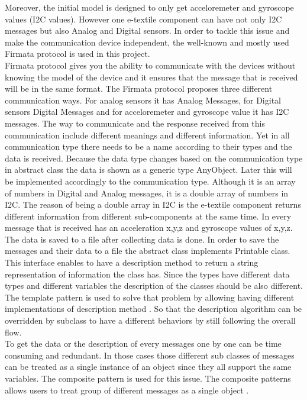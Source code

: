Moreover, the initial model is designed to only get acceloremeter and gyroscope values (I2C values). However one e-textile component can have not only I2C messages but also Analog and Digital sensors. In order to tackle this issue and make the communication device independent, the well-known and mostly used Firmata protocol is used in this project.\\

Firmata protocol gives you the ability to communicate with the devices without knowing the model of the device and it ensures that the message that is received will be in the same format. The Firmata protocol proposes three different communication ways. For analog sensors it has Analog Messages, for Digital sensors Digital Messages and for acceloremeter and gyroscope value it has I2C messages. The way to communicate and the response received from this communication include different meanings and different information. Yet in all communication type there needs to be a name according to their types and the data is received. Because the data type changes based on the communication type in abstract class the data is shown as a generic type AnyObject. Later this will be implemented accordingly to the communication type. Although it is an array of numbers in Digital and Analog messages, it is a double array of numbers in I2C. The reason of being a double array in I2C is the e-textile component returns different information from different sub-components at the same time. In every message that is received has an acceleration x,y,z and gyroscope values of x,y,z. \\

The data is saved to a file after collecting data is done. In order to save the messages and their data to a file the abstract class implements Printable class. This interface enables to have a description method to return a string representation of information the class has. Since the types have different data types and different variables the description of the classes should be also different. The template pattern is used to solve that problem by allowing having different implementations of description method \cite{GoF}. So that the description algorithm can be overridden by subclass to have a different behaviors by still following the overall flow. \\

To get the data or the description of every messages one by one can be time consuming and redundant. In those cases those different sub classes of messages can be treated as a single instance of an object since they all support the same variables. The composite pattern is used for this issue. The composite patterns allows users to treat group of different messages as a single object \cite{GoF}. \\
	
